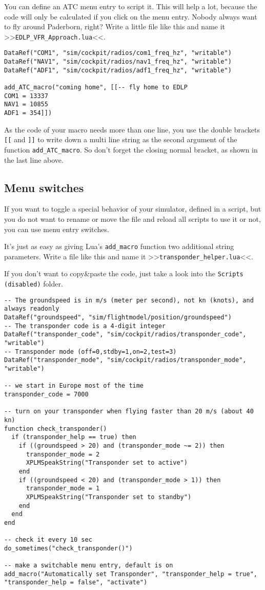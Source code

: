 \documentclass[11pt,parskip=half,a4paper]{scrartcl}
\begin{document}
You can define an ATC menu entry to script it. This will help a lot, because the code will only be calculated if you click on the menu entry. Nobody always want to fly around Paderborn, right? Write a little file like this and name it >>\verb|EDLP_VFR_Approach.lua|<<.

\begin{lstlisting}
DataRef("COM1", "sim/cockpit/radios/com1_freq_hz", "writable")
DataRef("NAV1", "sim/cockpit/radios/nav1_freq_hz", "writable")
DataRef("ADF1", "sim/cockpit/radios/adf1_freq_hz", "writable")

add_ATC_macro("coming home", [[-- fly home to EDLP
COM1 = 13337
NAV1 = 10855
ADF1 = 354]])
\end{lstlisting}

As the code of your macro needs more than one line, you use the double brackets \verb|[[| and \verb|]]| to write down a multi line string as the second argument of the function \verb|add_ATC_macro|. So don't forget the closing normal bracket, as shown in the last line above.

\subsection{Menu switches}

If you want to toggle a special behavior of your simulator, defined in a script, but you do not want to rename or move the file and reload all scripts to use it or not, you can use menu entry switches.

It's just as easy as giving Lua's \verb|add_macro| function two additional string parameters. Write a file like this and name it >>\verb|transponder_helper.lua|<<.

If you don't want to copy\&paste the code, just take a look into the \verb|Scripts (disabled)| folder.

\begin{lstlisting}
-- The groundspeed is in m/s (meter per second), not kn (knots), and always readonly
DataRef("groundspeed", "sim/flightmodel/position/groundspeed")
-- The transponder code is a 4-digit integer
DataRef("transponder_code", "sim/cockpit/radios/transponder_code", "writable")
-- Transponder mode (off=0,stdby=1,on=2,test=3)
DataRef("transponder_mode", "sim/cockpit/radios/transponder_mode", "writable")

-- we start in Europe most of the time
transponder_code = 7000

-- turn on your transponder when flying faster than 20 m/s (about 40 kn)
function check_transponder()
  if (transponder_help == true) then
    if ((groundspeed > 20) and (transponder_mode ~= 2)) then
      transponder_mode = 2
      XPLMSpeakString("Transponder set to active")
    end
    if ((groundspeed < 20) and (transponder_mode > 1)) then
      transponder_mode = 1
      XPLMSpeakString("Transponder set to standby")
    end
  end
end

-- check it every 10 sec
do_sometimes("check_transponder()")

-- make a switchable menu entry, default is on
add_macro("Automatically set Transponder", "transponder_help = true", "transponder_help = false", "activate")
\end{lstlisting}
\end{document}
